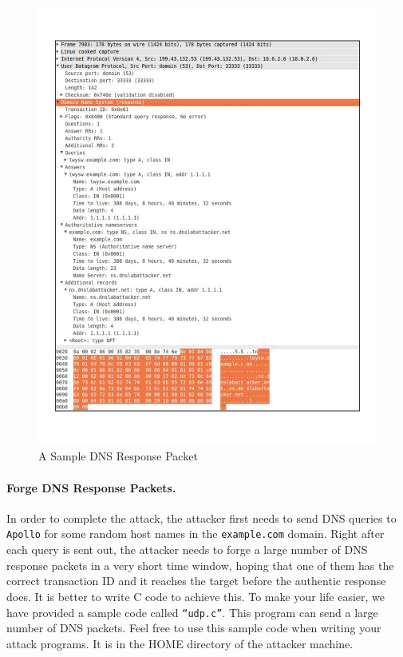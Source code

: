 \begin{figure}[!htb]
\centering
\includegraphics*[viewport=0 50 600 750,width=1.0\textwidth,natwidth=621,natheight=403]{Figs/screenshot_packet.pdf}
\caption{A Sample DNS Response Packet}
\label{fig:response_packet}
\end{figure}



\paragraph{Forge DNS Response Packets.}
In order to complete the attack, the attacker first needs to send 
DNS queries to {\tt Apollo} for some random host names in
the {\tt example.com} domain. Right after each query is sent out, 
the attacker needs to forge a large number of DNS response packets in a
very short time window,
hoping that one of them has the correct transaction ID and it reaches the target before 
the authentic response does. It is better to write C code to achieve this. 
To make your life easier, we have provided a sample code called {\tt “udp.c”}. 
This program can send a large number of DNS packets. Feel free to 
use this sample code when writing your attack programs. It is in the HOME directory
of the attacker machine.

